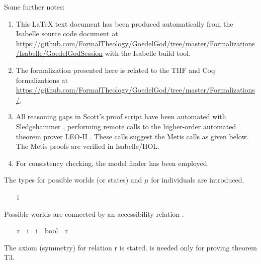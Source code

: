\begin{isabellebody}
\begin{isamarkuptext}
 Some further notes: \sloppy
 \begin{enumerate}
 \item This LaTeX text document has been produced automatically from the Isabelle source
 code document at 
 \url{https://github.com/FormalTheology/GoedelGod/tree/master/Formalizations/Isabelle/GoedelGodSession} 
 with the Isabelle build tool.
 \item The formalization presented here is related to the THF \cite{J22} and 
    Coq \cite{Coq} formalizations at
    \url{https://github.com/FormalTheology/GoedelGod/tree/master/Formalizations/}.
 \item All reasoning gaps in Scott's proof script have been automated 
    with Sledgehammer \cite{Sledgehammer}, performing remote calls to the higher-order automated
    theorem prover LEO-II \cite{LEO-II}. These calls suggest the 
    Metis \cite{Metis} calls as given below. The Metis proofs are verified in Isabelle/HOL.
 \item For consistency checking, the model finder \cite{Nitpick} has been employed.
 \end{enumerate}%
\end{isamarkuptext}%
\isamarkuptrue%
%
\isamarkuptrue%
%
\begin{isamarkuptext}%
The types  for possible worlds (or states) and $\mu$ for individuals 
are introduced.%
\end{isamarkuptext}%
\isamarkuptrue%
\ \ \isamarkupfalse%
\ i\ \ \ \ %
\ \isanewline
\ \ \isamarkupfalse%
\ {\isasymmu}\ \ \ \ %
%
\begin{isamarkuptext}%
Possible worlds are connected by an accessibility relation .%
\end{isamarkuptext}%
\isamarkuptrue%
\ \ \isamarkupfalse%
\ r\ {\isacharcolon}{\isacharcolon}\ {\isachardoublequoteopen}i\ {\isasymRightarrow}\ i\ {\isasymRightarrow}\ bool{\isachardoublequoteclose}\ {\isacharparenleft}\ {\isachardoublequoteopen}r{\isachardoublequoteclose}\ {}{}{\isacharparenright}\ \ \ \ %
%
\begin{isamarkuptext}%
The  axiom (symmetry) for relation r is stated.  is needed only 
for proving theorem T3.%
\end{isamarkuptext}%
\isamarkuptrue%
\ \ \isamarkupfalse%

\end{isabellebody}

